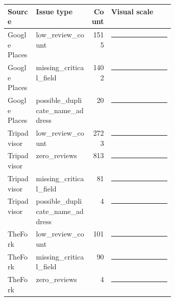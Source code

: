 {\scriptsize
\begin{tabular}{llrp{0.38\linewidth}}
\toprule
Source & Issue type & Count & Visual scale \\
\midrule
Google Places & low\_review\_count & 1515 & \textcolor{qualityorange}{\rule{27.8mm}{5pt}} \\
Google Places & missing\_critical\_field & 1402 & \textcolor{qualityorange}{\rule{25.7mm}{5pt}} \\
Google Places & possible\_duplicate\_name\_address & 20 & \textcolor{qualityorange}{\rule{0.6mm}{5pt}} \\
Tripadvisor & low\_review\_count & 2723 & \textcolor{qualityorange}{\rule{50.0mm}{5pt}} \\
Tripadvisor & zero\_reviews & 813 & \textcolor{qualityorange}{\rule{14.9mm}{5pt}} \\
Tripadvisor & missing\_critical\_field & 81 & \textcolor{qualityorange}{\rule{1.5mm}{5pt}} \\
Tripadvisor & possible\_duplicate\_name\_address & 4 & \textcolor{qualityorange}{\rule{0.6mm}{5pt}} \\
TheFork & low\_review\_count & 101 & \textcolor{qualityorange}{\rule{1.9mm}{5pt}} \\
TheFork & missing\_critical\_field & 90 & \textcolor{qualityorange}{\rule{1.7mm}{5pt}} \\
TheFork & zero\_reviews & 4 & \textcolor{qualityorange}{\rule{0.6mm}{5pt}} \\
\bottomrule
\end{tabular}
}
